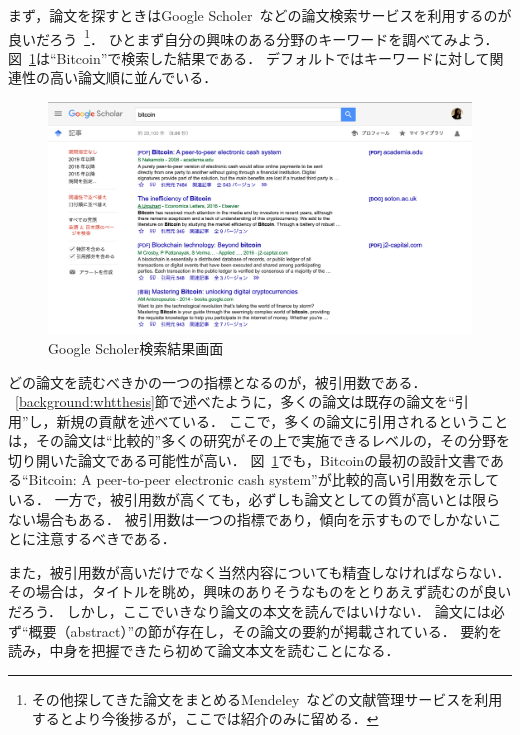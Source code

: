 まず，論文を探すときはGoogle Scholer~\cite{googlescholer}などの論文検索サービスを利用するのが良いだろう~\footnote{その他探してきた論文をまとめるMendeley~\cite{mendeley}などの文献管理サービスを利用するとより今後捗るが，ここでは紹介のみに留める．}．
ひとまず自分の興味のある分野のキーワードを調べてみよう．
図~\ref{img:scholersearch}は``Bitcoin''で検索した結果である．
デフォルトではキーワードに対して関連性の高い論文順に並んでいる．

\begin{figure}[htb]
    \begin{center}
        \includegraphics[width=450pt]{./img/scholersearch.png}
        \caption{Google Scholer検索結果画面}
        \label{img:scholersearch}
    \end{center}
\end{figure}

どの論文を読むべきかの一つの指標となるのが，被引用数である．
~\ref{background:whtthesis}節で述べたように，多くの論文は既存の論文を``引用''し，新規の貢献を述べている．
ここで，多くの論文に引用されるということは，その論文は``比較的''多くの研究がその上で実施できるレベルの，その分野を切り開いた論文である可能性が高い．
図~\ref{img:scholersearch}でも，Bitcoinの最初の設計文書である``Bitcoin: A peer-to-peer electronic cash system''が比較的高い引用数を示している．
一方で，被引用数が高くても，必ずしも論文としての質が高いとは限らない場合もある．
被引用数は一つの指標であり，傾向を示すものでしかないことに注意するべきである．

また，被引用数が高いだけでなく当然内容についても精査しなければならない．
その場合は，タイトルを眺め，興味のありそうなものをとりあえず読むのが良いだろう．
しかし，ここでいきなり論文の本文を読んではいけない．
論文には必ず``概要（abstract）''の節が存在し，その論文の要約が掲載されている．
要約を読み，中身を把握できたら初めて論文本文を読むことになる．

